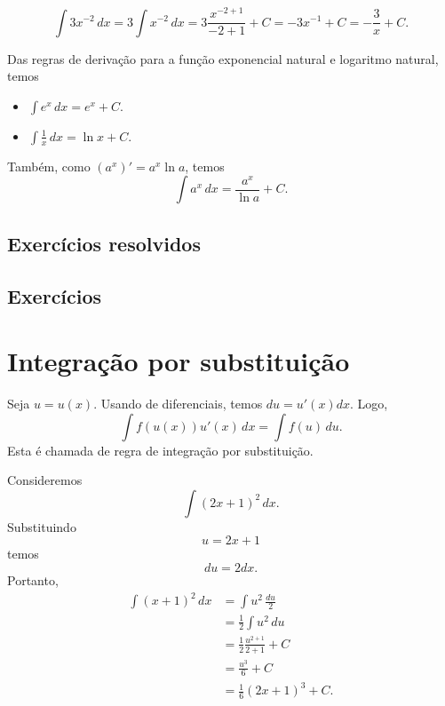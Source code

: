 \begin{ex}
  \begin{equation}
    \int 3x^{-2}\,dx = 3\int x^{-2}\,dx = 3\frac{x^{-2+1}}{-2+1} + C = -3x^{-1} + C = -\frac{3}{x} + C.
  \end{equation}
\end{ex}

Das regras de derivação para a função exponencial natural e logaritmo natural, temos
\begin{itemize}
\item $\displaystyle \int e^x\,dx = e^x + C$.
\item $\displaystyle \int \frac{1}{x}\,dx = \ln x + C$.
\end{itemize}
Também, como $(a^x)' = a^x\ln a$, temos
\begin{equation}
  \int a^x\,dx = \frac{a^x}{\ln a} + C.
\end{equation}

\subsection*{Exercícios resolvidos}

\emconstrucao

\subsection{Exercícios}

\emconstrucao

\section{Integração por substituição}\label{cap_int_sec_subs}

Seja $u = u(x)$. Usando de diferenciais, temos $du = u'(x)dx$. Logo,
\begin{equation}
  \int f(u(x))u'(x)\,dx = \int f(u)\,du.
\end{equation}
Esta é chamada de regra de integração por substituição.

\begin{ex}
  Consideremos
  \begin{equation}
    \int (2x+1)^2\,dx.
  \end{equation}
  Substituindo
  \begin{equation}
    u = 2x+1
  \end{equation}
  temos
  \begin{equation}
    du = 2dx.
  \end{equation}
  Portanto,
  \begin{align}
    \int (x+1)^2\,dx &= \int u^2\,\frac{du}{2}\\
                     &= \frac{1}{2}\int u^2\,du\\
                     &= \frac{1}{2}\frac{u^{2+1}}{2+1} + C\\
                     &= \frac{u^3}{6} + C\\
                     &= \frac{1}{6}(2x+1)^3 + C.
  \end{align}
\end{ex}

